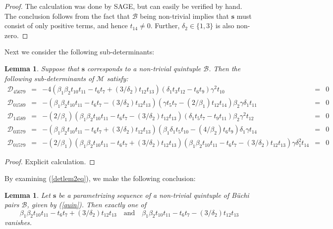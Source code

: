 \documentclass[letterpaper,10pt]{amsart}
\newcommand{\Bs}{{\mathbf{s}}}
\newcommand{\B}{{\mathcal{B}}}
\newcommand{\D}{{\mathcal{D}}}
\newcommand{\M}{{\mathcal{M}}}
\newtheorem{lemma}[theorem]{Lemma}
\theoremstyle{definition}
\numberwithin{equation}{section}
\begin{document}
\begin{proof} The calculation was done by SAGE, but can easily be verified by hand. The conclusion follows from the fact that $\B$ being non-trivial implies that $\Bs$ must consist of only positive terms, and hence $t_{14} \ne 0$. Further, $\delta_2 \in \{1,3\}$ is also non-zero. 
\end{proof}

Next we consider the following sub-determinants:

\begin{lemma} \label{detlem2} Suppose that $\Bs$ corresponds to a non-trivial quintuple $\B$. Then the following sub-determinants of $\M$ satisfy: 
\begin{equation} \label{detlem2eq} 
\begin{matrix} 
\D_{45679} & = & -4(\beta_1 \beta_2 t_{10} t_{11} - t_6 t_7 + (3/\delta_2) t_{12} t_{13})(\delta_1 t_3 t_{12} - t_6 t_9) \gamma^2 t_{10} & = & 0 \\ 
\D_{01589} & = & -(\beta_1 \beta_2 t_{10} t_{11} - t_6 t_7 - (3/\delta_2) t_{12} t_{13})( \gamma t_5 t_7 - (2/\beta_1) t_{12} t_{14}) \beta_2 \gamma \delta_1 t_{11} & = & 0 \\
\D_{14589} & = & -(2/\beta_1) (\beta_1 \beta_2 t_{10} t_{11} - t_6 t_7 - (3/\delta_2) t_{12} t_{13})(\delta_1 t_5 t_7 - t_9 t_{11}) \beta_2 \gamma^2 t_{12} & = & 0 \\ 
\D_{03579} & = & - (\beta_1 \beta_2 t_{10} t_{11} - t_6 t_7 + (3/\delta_2) t_{12} t_{13})(\beta_1  \delta_1 t_5 t_{10} - (4/\beta_2) t_6 t_9) \delta_1 \gamma t_{14} & = & 0 \\ 
\D_{01579} & = & -(2/\beta_1) (\beta_1 \beta_2 t_{10} t_{11} - t_6 t_7 + (3/\delta_2) t_{12} t_{13})(\beta_1 \beta_2  t_{10} t_{11} - t_6 t_7 - (3/\delta_2) t_{12} t_{13}) \gamma \delta_1^2 t_{14} & = & 0
\end{matrix} 
\end{equation}
\end{lemma} 

\begin{proof} Explicit calculation. 
\end{proof}

By examining (\ref{detlem2eq}), we make the following conclusion: 

\begin{lemma} \label{detlem3} Let $\Bs$ be a parametrizing sequence of a non-trivial quintuple of B\"{u}chi pairs $\B$, given by (\ref{quin}). Then exactly one of 
\[\beta_1 \beta_2 t_{10} t_{11} - t_6 t_7 + (3/\delta_2) t_{12} t_{13} \quad \text{and} \quad \beta_1 \beta_2 t_{10} t_{11} - t_6 t_7 - (3/\delta_2) t_{12} t_{13}\]
vanishes. 
\end{lemma} 
\end{document}
